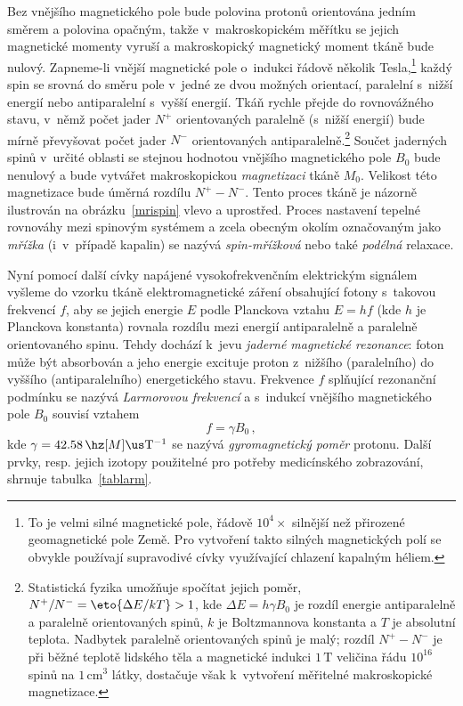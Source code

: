 Bez vnějšího magnetického pole bude polovina protonů orientována jedním směrem
a polovina opačným, takže v~makroskopickém měřítku se jejich magnetické
momenty vyruší a makroskopický magnetický moment tkáně bude nulový.
Zapneme-li vnější magnetické pole o~indukci řádově několik Tesla,\footnote{To
  je velmi silné magnetické pole, řádově $10^{4}\times$ silnější než přirozené
  geomagnetické pole Země. Pro vytvoření takto silných magnetických polí se
  obvykle používají supravodivé cívky využívající chlazení kapalným héliem.}
každý spin se srovná do směru pole v~jedné ze dvou možných orientací,
paralelní s~nižší energií nebo antiparalelní s~vyšší energií.  Tkáň rychle
přejde do rovnovážného stavu, v~němž počet jader $N^{+}$ orientovaných
paralelně (s~nižší energií) bude mírně převyšovat počet jader $N^{-}$
orientovaných antiparalelně.\footnote{Statistická fyzika umožňuje spočítat
  jejich poměr, $N^{+}/N^{-} = \eto{\Delta E/kT}>1$, kde
  $\Delta E = h\gamma B_{0}$ je rozdíl energie antiparalelně a paralelně
  orientovaných spinů, $k$ je Boltzmannova konstanta a $T$ je absolutní
  teplota. Nadbytek paralelně orientovaných spinů je malý; rozdíl
  $N^{+}-N^{-}$ je při běžné teplotě lidského těla a magnetické indukci
  $1\,\mathrm{T}$ veličina řádu $10^{16}$ spinů na $1\,\mathrm{cm^{3}}$ látky,
  dostačuje však k~vytvoření měřitelné makroskopické magnetizace.} Součet
jaderných spinů v~určité oblasti se stejnou hodnotou vnějšího magnetického
pole $B_{0}$ bude nenulový a bude vytvářet makroskopickou \emph{magnetizaci}
tkáně $M_{0}$.  Velikost této magnetizace bude úměrná rozdílu $N^{+}-N^{-}$.
Tento proces  tkáně je názorně ilustrován na
obrázku~\ref{mrispin} vlevo a uprostřed. Proces nastavení tepelné rovnováhy
mezi spinovým systémem a zcela obecným okolím označovaným jako \emph{mřížka}
(i~v~případě kapalin) se nazývá \emph{spin-mřížková} nebo také \emph{podélná}
relaxace.

Nyní pomocí další cívky napájené vysokofrekvenčním elektrickým signálem
vyšleme do vzorku tkáně elektromagnetické
záření obsahující fotony s~takovou frekvencí
$f$, aby se jejich energie $E$ podle Planckova vztahu $E=hf$ (kde $h$ je
Planckova konstanta) rovnala rozdílu mezi energií antiparalelně a paralelně
orientovaného spinu. Tehdy dochází k~jevu \emph{jaderné magnetické rezonance}:
foton může být absorbován a jeho energie excituje proton z~nižšího
(paralelního) do vyššího (antiparalelního) energetického stavu. Frekvence $f$
splňující rezonanční podmínku se nazývá \emph{Larmorovou frekvencí} a
s~indukcí vnějšího magnetického pole $B_{0}$ souvisí vztahem
\begin{equation}
  f = \gamma B_{0}\,,                                        \label{larmor}
\end{equation}
kde $\gamma=42.58\,\hz[M]\us\mathrm{T^{-1}}$ se nazývá \emph{gyromagnetický
  poměr} protonu. Další prvky, resp. jejich izotopy použitelné pro potřeby
medicínského zobrazování, shrnuje tabulka~\ref{tablarm}.

